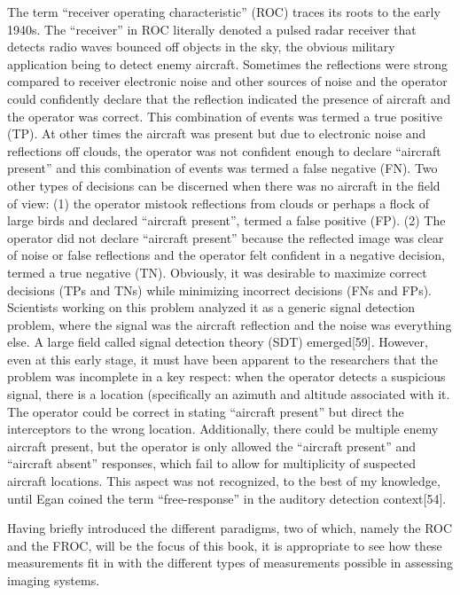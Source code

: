 \documentclass[
]{book}
\begin{document}
The term ``receiver operating characteristic'' (ROC) traces its roots to the early 1940s. The ``receiver'' in ROC literally denoted a pulsed radar receiver that detects radio waves bounced off objects in the sky, the obvious military application being to detect enemy aircraft. Sometimes the reflections were strong compared to receiver electronic noise and other sources of noise and the operator could confidently declare that the reflection indicated the presence of aircraft and the operator was correct. This combination of events was termed a true positive (TP). At other times the aircraft was present but due to electronic noise and reflections off clouds, the operator was not confident enough to declare ``aircraft present'' and this combination of events was termed a false negative (FN). Two other types of decisions can be discerned when there was no aircraft in the field of view: (1) the operator mistook reflections from clouds or perhaps a flock of large birds and declared ``aircraft present'', termed a false positive (FP). (2) The operator did not declare ``aircraft present'' because the reflected image was clear of noise or false reflections and the operator felt confident in a negative decision, termed a true negative (TN). Obviously, it was desirable to maximize correct decisions (TPs and TNs) while minimizing incorrect decisions (FNs and FPs). Scientists working on this problem analyzed it as a generic signal detection problem, where the signal was the aircraft reflection and the noise was everything else. A large field called signal detection theory (SDT) emerged{[}59{]}. However, even at this early stage, it must have been apparent to the researchers that the problem was incomplete in a key respect: when the operator detects a suspicious signal, there is a location (specifically an azimuth and altitude associated with it. The operator could be correct in stating ``aircraft present'' but direct the interceptors to the wrong location. Additionally, there could be multiple enemy aircraft present, but the operator is only allowed the ``aircraft present'' and ``aircraft absent'' responses, which fail to allow for multiplicity of suspected aircraft locations. This aspect was not recognized, to the best of my knowledge, until Egan coined the term ``free-response'' in the auditory detection context{[}54{]}.

Having briefly introduced the different paradigms, two of which, namely the ROC and the FROC, will be the focus of this book, it is appropriate to see how these measurements fit in with the different types of measurements possible in assessing imaging systems.
\end{document}

